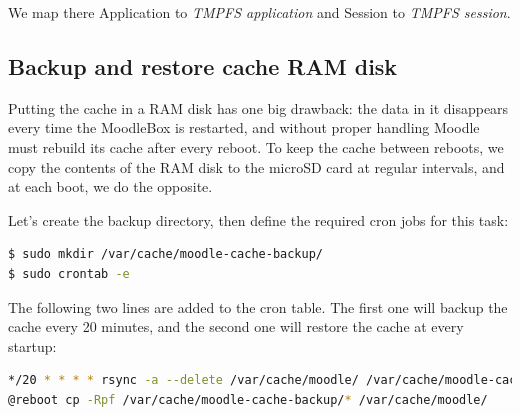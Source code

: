 \documentclass[12pt]{article}
\begin{document}
We map there Application to \emph{TMPFS application} and Session to \emph{TMPFS session}.

\subsection{Backup and restore cache RAM disk}

Putting the cache in a RAM disk has one big drawback: the data in it disappears every time the MoodleBox is restarted, and without proper handling Moodle must rebuild its cache after every reboot.
To keep the cache between reboots, we copy the contents of the RAM disk to the microSD card at regular intervals, and at each boot, we do the opposite.

Let's create the backup directory, then define the required cron jobs for this task:
\begin{lstlisting}[language=bash]
$ sudo mkdir /var/cache/moodle-cache-backup/
$ sudo crontab -e
\end{lstlisting}

The following two lines are added to the cron table.
The first one will backup the cache every 20 minutes, and the second one will restore the cache at every startup:
\begin{lstlisting}[language=bash]
*/20 * * * * rsync -a --delete /var/cache/moodle/ /var/cache/moodle-cache-backup/
@reboot cp -Rpf /var/cache/moodle-cache-backup/* /var/cache/moodle/
\end{lstlisting}
\end{document}
